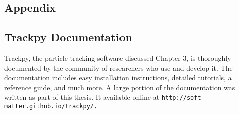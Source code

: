 \begin{appendices}
\chapter{Appendix}

\section{Trackpy Documentation}

Trackpy, the particle-tracking software discussed Chapter 3, is thoroughly documented by the community of researchers who use and develop it. The documentation includes easy installation instructions, detailed tutorials, a reference guide, and much more. A large portion of the documentation was written as part of this thesis. It available online at \tt{http://soft-matter.github.io/trackpy/}.

\end{appendices}